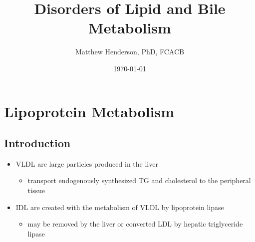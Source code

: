 \documentclass{scrartcl}
\author{Matthew Henderson, PhD, FCACB}
\date{\today}
\title{Disorders of Lipid and Bile Metabolism}
\begin{document}
\maketitle
\tableofcontents


\section{Lipoprotein Metabolism}
\label{sec:org9cb2f63}
\subsection{Introduction}
\label{sec:orga749c70}
\begin{itemize}
\item VLDL are large particles produced in the liver
\begin{itemize}
\item transport endogenously synthesized TG and cholesterol to the peripheral tissue
\end{itemize}
\item IDL are created with the metabolism of VLDL by lipoprotein lipase
\begin{itemize}
\item may be removed by the liver or converted LDL by hepatic triglyceride lipase
\end{itemize}
\end{itemize}
\end{document}
